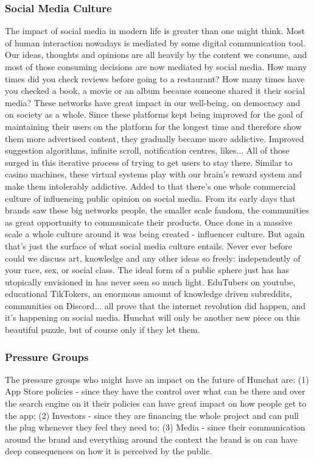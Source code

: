 \documentclass[12pt]{article}
\begin{document}
	\subsubsection{Social Media Culture}
	The impact of social media in modern life is greater than one might think. Most of human interaction nowadays is mediated by some digital communication tool. Our ideas, thoughts and opinions are all heavily by the content we consume, and most of those consuming decisions are now mediated by social media. How many times did you check reviews before going to a restaurant? How many times have you checked a book, a movie or an album because someone shared it their social media? These networks have great impact in our well-being, on democracy and on society as a whole. Since these platforms kept being improved for the goal of maintaining their users on the platform for the longest time and therefore show them more advertised content, they gradually became more addictive. Improved suggestion algorithms, infinite scroll, notification centres, likes... All of those surged in this iterative process of trying to get users to stay there. Similar to casino machines, these virtual systems play with our brain's reward system and make them intolerably addictive. Added to that there's one whole commercial culture of influencing public opinion on social media. From its early days that brands saw these big networks people, the smaller scale fandom, the communities as great opportunity to communicate their products. Once done in a massive scale a whole culture around it was being created - influencer culture. But again that's just the surface of what social media culture entails. Never ever before could we discuss art, knowledge and any other ideas so freely: independently of your race, sex, or social class. The ideal form of a public sphere just has \citeauthor{habermas} has utopically envisioned in \citeyear{habermas} has never seen so much light. EduTubers on youtube, educational TikTokers, an enormous amount of knowledge driven subreddits, communities on Discord... all prove that the internet revolution did happen, and it's happening on social media. Hunchat will only be another new piece on this beautiful puzzle, but of course only if they let them.
	
	\subsubsection{Pressure Groups}
	The pressure groups who might have an impact on the future of Hunchat are: (1) App Store policies - since they have the control over what can be there and over the search engine on it their policies can have great impact on how people get to the app; (2) Investors - since they are financing the whole project and can pull the plug whenever they feel they need to; (3) Media - since their communication around the brand and everything around the context the brand is on can have deep consequences on how it is perceived by the public.
	
\end{document}
